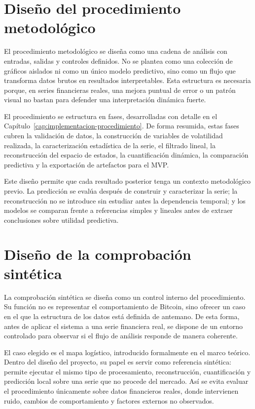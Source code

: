 \section{Diseño del procedimiento metodológico}\label{sec:diseno-procedimiento}

El procedimiento metodológico se diseña como una cadena de análisis con entradas, salidas y controles definidos. No se plantea como una colección de gráficos aislados ni como un único modelo predictivo, sino como un flujo que transforma datos brutos en resultados interpretables. Esta estructura es necesaria porque, en series financieras reales, una mejora puntual de error o un patrón visual no bastan para defender una interpretación dinámica fuerte.

El procedimiento se estructura en fases, desarrolladas con detalle en el Capítulo~\ref{cap:implementacion-procedimiento}. De forma resumida, estas fases cubren la validación de datos, la construcción de variables de volatilidad realizada, la caracterización estadística de la serie, el filtrado lineal, la reconstrucción del espacio de estados, la cuantificación dinámica, la comparación predictiva y la exportación de artefactos para el MVP.

Este diseño permite que cada resultado posterior tenga un contexto metodológico previo. La predicción se evalúa después de construir y caracterizar la serie; la reconstrucción no se introduce sin estudiar antes la dependencia temporal; y los modelos se comparan frente a referencias simples y lineales antes de extraer conclusiones sobre utilidad predictiva.

\section{Diseño de la comprobación sintética}\label{sec:diseno-comprobacion-sintetica}

La comprobación sintética se diseña como un control interno del procedimiento. Su función no es representar el comportamiento de Bitcoin, sino ofrecer un caso en el que la estructura de los datos está definida de antemano. De esta forma, antes de aplicar el sistema a una serie financiera real, se dispone de un entorno controlado para observar si el flujo de análisis responde de manera coherente.

El caso elegido es el mapa logístico, introducido formalmente en el marco teórico. Dentro del diseño del proyecto, su papel es servir como referencia sintética: permite ejecutar el mismo tipo de procesamiento, reconstrucción, cuantificación y predicción local sobre una serie que no procede del mercado. Así se evita evaluar el procedimiento únicamente sobre datos financieros reales, donde intervienen ruido, cambios de comportamiento y factores externos no observados.

